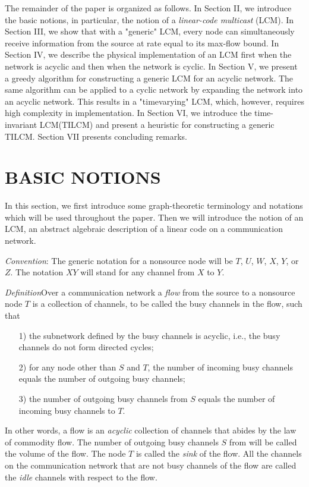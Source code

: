 \documentclass{IEEEtran}
\begin{document}
The remainder of the paper is organized as follows. In Section II, we introduce the basic notions, in particular, the notion of a \emph{linear-code multicast} (LCM). In Section III, we show that with a "generic" LCM, every node can simultaneously receive information from the source at rate equal to its max-flow bound. In Section IV, we describe the physical implementation of an LCM first when the network is acyclic and then when the network is cyclic. In Section V, we present a greedy algorithm for constructing a generic LCM for an acyclic network. The same algorithm can be applied to a cyclic network by expanding the network into an acyclic network. This results in a "timevarying" LCM, which, however, requires high complexity in implementation. In Section VI, we introduce the time-invariant LCM(TILCM) and present a heuristic for constructing a generic TILCM. Section VII presents concluding remarks.

\section{BASIC NOTIONS}\label{sec:basic notions}
\par
In this section, we first introduce some graph-theoretic terminology and notations which will be used throughout the paper. Then we will introduce the notion of an LCM, an abstract algebraic description of a linear code on a communication network.
\par
\emph{Convention}: The generic notation for a nonsource node will be $T$, $U$, $W$, $X$, $Y$, or $Z$. The notation $XY$ will stand for any channel from $X$ to $Y$.
\par
\emph{Definition}Over a communication network a \emph{flow} from the source to a nonsource node $T$ is a collection of channels, to be called the busy channels in the flow, such that
\begin{itemize}
	\item[1)] the subnetwork defined by the busy channels is acyclic, i.e., the busy channels do not form directed cycles;
	\item[2)] for any node other than $S$ and $T$, the number of incoming busy channels equals the number of outgoing 	busy channels;
	\item[3)] the number of outgoing busy channels from $S$ equals the number of incoming busy channels to $T$.
\end{itemize}
\par
In other words, a flow is an \emph{acyclic} collection of channels that abides by the law of commodity flow. The number of outgoing busy channels $S$ from will be called the volume of the flow. The node $T$ is called the \emph{sink} of the flow. All the channels on the communication network that are not busy channels of the flow are called the \emph{idle} channels with respect to the flow.
\end{document}
